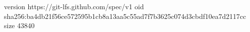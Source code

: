 version https://git-lfs.github.com/spec/v1
oid sha256:ba4db21f56ce572595b1cb8a13aa5c55ad7f7b3625c074d3cbdf10ea7d2117cc
size 43840
